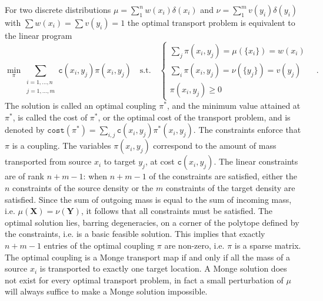 \documentclass[twoside,11pt]{article}
\newcommand{\cost}[0]{\mathtt{c}}
\newcommand{\couplingcost}[0]{\mathtt{cost}}
\newcommand{\coupling}[0]{\pi}
\newcommand{\Xsp}{{\mathbf{X}}}
\newcommand{\Ysp}{{\mathbf{Y}}}
\begin{document}
For two discrete distributions $\mu = \sum_1^n w(x_i) \delta(x_i)$ and $ \nu =
\sum_1^m v(y_i) \delta(y_i)$ with $\sum w(x_i) = \sum v(y_i) = 1$ the optimal
transport problem is equivalent to the linear program 
\begin{equation}
\min_\coupling \sum_{\substack{i=1,\dots,n\\ j=1,\dots,m}} 
      \cost(x_i, y_j) \coupling(x_i, y_j) \quad \text{s.t.}\quad 
\begin{cases}
\sum_j \coupling(x_i, y_j) = \mu(\{x_i\})= w(x_i) & \\ 
\sum_i \coupling(x_i, y_j) = \nu(\{y_j\}) = v(y_j) & \\
 \coupling(x_i,y_j)\ge 0
\end{cases}\,.
\label{e:LPformulation}
\end{equation} The solution is called an optimal coupling $\coupling^*$, and the
minimum value attained at $\coupling^*$, is called the cost of $\pi^*$, or the
optimal cost of the transport problem, and is denoted by
$\couplingcost(\coupling^*)=\sum_{i,j} \cost(x_i,y_j)\pi^*(x_i,y_j)$. The
constraints enforce that $\coupling$ is a coupling. The variables
$\coupling(x_i, y_j)$ correspond to the amount of mass transported from
source $x_i$ to target $y_j$, at cost $\cost(x_i, y_j)$.  The linear
constraints are of rank $n+m-1$: when $n+m-1$ of the constraints are satisfied,
either the $n$ constraints of the source density or the $m$ constraints of the
target density are satisfied. Since the sum of outgoing mass is equal to the sum
of incoming mass, i.e. $\mu(\Xsp) = \nu(\Ysp)$, it follows that all constraints
must be satisfied. The optimal solution lies, barring degeneracies, on a corner
of the polytope defined by the constraints, i.e. is a basic feasible solution. 
This implies that exactly $n+m-1$ entries of the optimal coupling $\coupling$
are non-zero, i.e. $\pi$ is a sparse matrix.  The optimal coupling is a Monge
transport map if and only if all the mass of a source $x_i$ is transported to
exactly one target location. A Monge solution does not exist for every optimal
transport problem, in fact a small perturbation of $\mu$ will always suffice to
make a Monge solution impossible. 

\end{document}
